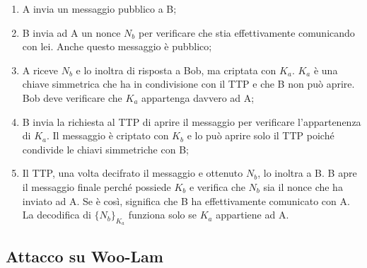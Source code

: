 \begin{enumerate}
    \item A invia un messaggio pubblico a B;
    \item B invia ad A un nonce \(N_b\) per verificare che stia
          effettivamente comunicando con lei. Anche questo messaggio è
          pubblico;
    \item A riceve \(N_b\) e lo inoltra di risposta a Bob, ma criptata con
          \(K_a\). \(K_a\) è una chiave simmetrica che ha in condivisione con il
          TTP e che B non può aprire. Bob deve verificare che \(K_a\)
          appartenga davvero ad A;
    \item B invia la richiesta al TTP di aprire il messaggio per verificare
          l'appartenenza di \(K_a\). Il messaggio è criptato con \(K_b\) e lo
          può aprire solo il TTP poiché condivide le chiavi simmetriche con B;
    \item Il TTP, una volta decifrato il messaggio e ottenuto \(N_b\), lo
          inoltra a B. B apre il messaggio finale perché possiede \(K_b\) e
          verifica che \(N_b\) sia il nonce che ha inviato ad A. Se è così,
          significa che B ha effettivamente comunicato con A. La decodifica di
          \(\{N_b\}_{K_a}\) funziona solo se \(K_a\) appartiene ad A.
\end{enumerate}

\subsection{Attacco su Woo-Lam}

